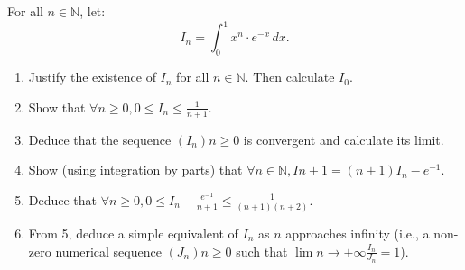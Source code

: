 \documentclass[12pt]{article}
\begin{document}
\newpage

\section{}
For all $n \in \mathbb{N}$, let:
$$I_n=\int_{0}^{1} x^n \cdot e^{-x} \, dx.$$
\begin{enumerate}
\item Justify the existence of $I_n$ for all $n \in \mathbb{N}$. Then calculate $I_0$.
\item Show that $\forall n \geq 0, 0 \leq I_n \leq \frac{1}{n+1}$.
\item Deduce that the sequence $(I_n){n \geq 0}$ is convergent and calculate its limit.
\item Show (using integration by parts) that $\forall n \in \mathbb{N}, I{n+1} = (n+1)I_n - e^{-1}$.
\item Deduce that $\forall n \geq 0, 0 \leq I_n - \frac{e^{-1}}{n+1} \leq \frac{1}{(n+1)(n+2)}$.
\item From 5, deduce a simple equivalent of $I_n$ as $n$ approaches infinity (i.e., a non-zero numerical sequence $(J_n){n \geq 0}$ such that $\lim{n \to +\infty} \frac{I_n}{J_n} = 1$).
\end{enumerate}

\newpage
\end{document}

